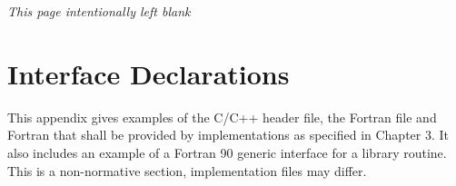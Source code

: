 %
%
%
%
%
%
%
%
%
%
%
%
%



\clearpage
\thispagestyle{empty}
\phantom{a}
\emph{This page intentionally left blank}
\vfill




\chapter{Interface Declarations}
\label{chap:Interface Declarations}
This appendix gives examples of the C/C++ header file, the Fortran  file and 
Fortran  that shall be provided by implementations as specified in Chapter 3. It 
also includes an example of a Fortran 90 generic interface for a library routine. This is a 
non-normative section, implementation files may differ.




